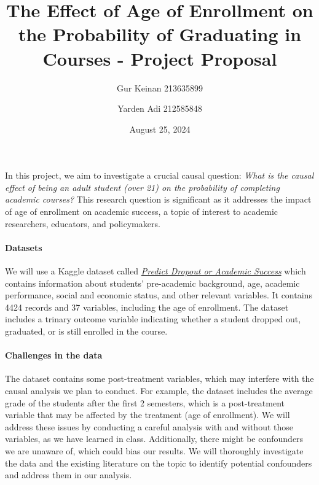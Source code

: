 \documentclass[11pt]{article}
\title{The Effect of Age of Enrollment on the Probability of Graduating in Courses - Project Proposal}
\author{Gur Keinan 213635899 \and Yarden Adi 212585848}
\date{August 25, 2024}
\begin{document}
\maketitle

In this project, we aim to investigate a crucial causal question: \textit{What is the causal effect of being an adult student (over 21) on the probability of completing academic courses?} This research question is significant as it addresses the impact of age of enrollment on academic success, a topic of interest to academic researchers, educators, and policymakers.

\paragraph{Datasets} We will use a Kaggle dataset called \href{https://www.kaggle.com/datasets/ankanhore545/dropout-or-academic-success}{\textit{Predict Dropout or Academic Success}} which contains information about students' pre-academic background, age, academic performance, social and economic status, and other relevant variables. It contains 4424 records and 37 variables, including the age of enrollment. The dataset includes a trinary outcome variable indicating whether a student dropped out, graduated, or is still enrolled in the course.

\paragraph{Challenges in the data} The dataset contains some post-treatment variables, which may interfere with the causal analysis we plan to conduct. For example, the dataset includes the average grade of the students after the first 2 semesters, which is a post-treatment variable that may be affected by the treatment (age of enrollment). We will address these issues by conducting a careful analysis with and without those variables, as we have learned in class. Additionally, there might be confounders we are unaware of, which could bias our results. We will thoroughly investigate the data and the existing literature on the topic to identify potential confounders and address them in our analysis.
\end{document}
